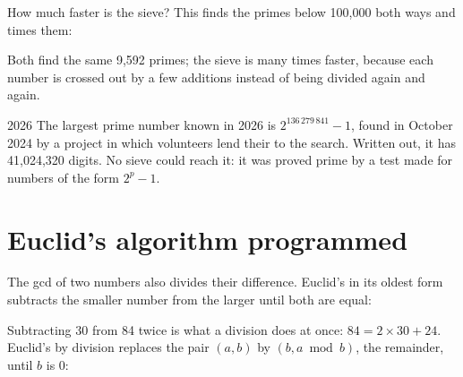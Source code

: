 How much faster is the sieve? This  finds the primes below 100,000 both
ways and times them:

\label{lst:g9:algorithms-on-numbers:timing}

\label{out:g9:algorithms-on-numbers:timing}

Both find the same 9,592 primes; the sieve is many times faster, because each
number is crossed out by a few additions instead of being divided again and
again.

\begin{dated}{2026}
The largest prime number known in 2026 is $2^{136\,279\,841} - 1$, found in
October 2024 by a project in which volunteers lend their  to the
search. Written out, it has 41,024,320 digits. No sieve could reach it: it was
proved prime by a test made for numbers of the form $2^p - 1$.
\end{dated}

\section{Euclid's algorithm programmed}

The gcd of two numbers also divides their difference. Euclid's  in its
oldest form subtracts the smaller number from the larger until both are equal:

\label{lst:g9:algorithms-on-numbers:subtract}

\label{out:g9:algorithms-on-numbers:subtract}

Subtracting 30 from 84 twice is what a division does at once: $84 = 2 \times 30
+ 24$. Euclid's  by division replaces the pair $(a, b)$ by $(b, a \bmod
b)$, the remainder, until $b$ is 0:


